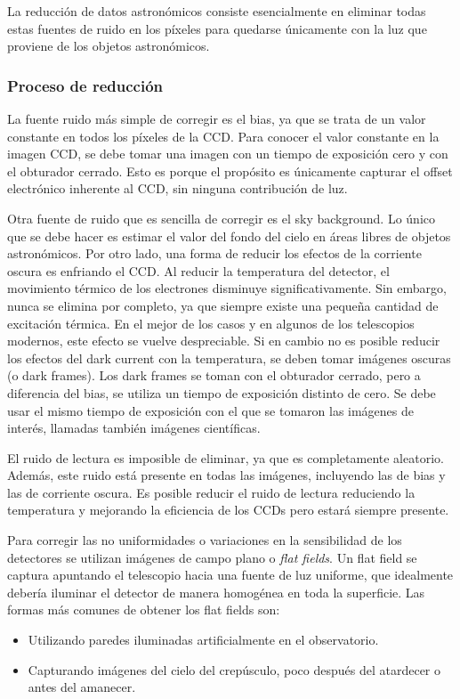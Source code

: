 La reducción de datos astronómicos consiste esencialmente en eliminar todas estas fuentes de ruido en los píxeles para quedarse únicamente con la luz que proviene de los objetos astronómicos. 

\subsubsection{Proceso de reducción}
La fuente ruido más simple de corregir es el bias, ya que se trata de un valor constante en todos los píxeles de la CCD. Para conocer el valor constante en la imagen CCD, se debe tomar una imagen con un tiempo de exposición cero y con el obturador cerrado. Esto es porque el propósito es únicamente capturar el offset electrónico inherente al CCD, sin ninguna contribución de luz. 

Otra fuente de ruido que es sencilla de corregir es el sky background. Lo único que se debe hacer es estimar el valor del fondo del cielo en áreas libres de objetos astronómicos. Por otro lado, una forma de reducir los efectos de la corriente oscura es enfriando el CCD. Al reducir la temperatura del detector, el movimiento térmico de los electrones disminuye significativamente. Sin embargo, nunca se elimina por completo, ya que siempre existe una pequeña cantidad de excitación térmica. En el mejor de los casos y en algunos de los telescopios modernos, este efecto se vuelve despreciable. Si en cambio no es posible reducir los efectos del dark current con la temperatura, se deben tomar imágenes oscuras (o dark frames). Los dark frames se toman con el obturador cerrado, pero a diferencia del bias, se utiliza un tiempo de exposición distinto de cero. Se debe usar el mismo tiempo de exposición con el que se tomaron las imágenes de interés, llamadas también imágenes científicas.

El ruido de lectura es imposible de eliminar, ya que es completamente aleatorio. Además, este ruido está presente en todas las imágenes, incluyendo las de bias y las de corriente oscura. Es posible reducir el ruido de lectura reduciendo la temperatura y mejorando la eficiencia de los CCDs pero estará siempre presente.

Para corregir las no uniformidades o variaciones en la sensibilidad de los detectores se utilizan imágenes de campo plano o \emph{flat fields}. Un flat field se captura apuntando el telescopio hacia una fuente de luz uniforme, que idealmente debería iluminar el detector de manera homogénea en toda la superficie. Las formas más comunes de obtener los flat fields son:
\begin{itemize}
  \item Utilizando paredes iluminadas artificialmente en el observatorio.
  \item Capturando imágenes del cielo del crepúsculo, poco después del atardecer o antes del amanecer.
\end{itemize}

